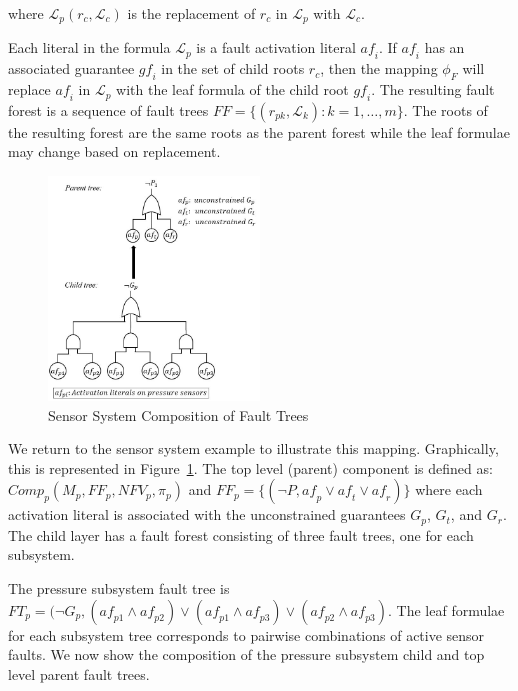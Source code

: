 where $\mathcal{L}_p(r_c, \mathcal{L}_c)$ is the replacement of $r_c$ in $\mathcal{L}_p$ with $\mathcal{L}_c$.

Each literal in the formula $\mathcal{L}_p$ is a fault activation literal $\mathit{af}_i$. If $\mathit{af}_i$ has an associated guarantee $\mathit{gf}_i$ in the set of child roots $r_c$, then the mapping $\phi_F$ will replace $\mathit{af}_i$ in $\mathcal{L}_p$ with the leaf formula of the child root $\mathit{gf}_i$.  The resulting fault forest is a sequence of fault trees $\mathit{FF} = \{(r_{pk}, \mathcal{L}_{k}): k = 1,\dots,m\}$. The roots of the resulting forest are the same roots as  the parent forest while the leaf formulae may change based on replacement. 



\begin{figure}[h!]
	\begin{center}
		\includegraphics[width=0.5\textwidth]{images/faultCompEx.JPG}
	\end{center}
	\caption{Sensor System Composition of Fault Trees}
	\label{fig:sensorSysComp}
\end{figure}
We return to the sensor system example to illustrate this mapping. Graphically, this is represented in Figure~\ref{fig:sensorSysComp}.  The top level (parent) component is defined as: $\mathit{Comp}_p (M_p, \mathit{FF}_p, \mathit{NFV}_p, \pi_p)$ and $\mathit{FF}_p = \{(\neg P, \mathit{af}_p \lor \mathit{af}_t \lor \mathit{af}_r)\}$ where each activation literal is associated with the unconstrained guarantees $G_p$, $G_t$, and $G_r$. The child layer has a fault forest consisting of three fault trees, one for each subsystem. 

The pressure subsystem fault tree is $\mathit{FT}_{p} = (\neg G_p, (\mathit{af}_{p1} \land \mathit{af}_{p2}) \lor (\mathit{af}_{p1} \land \mathit{af}_{p3}) \lor (\mathit{af}_{p2} \land \mathit{af}_{p3}) $. The leaf formulae for each subsystem tree corresponds to pairwise combinations of active sensor faults. We now show the composition of the pressure subsystem child and top level parent fault trees. 

